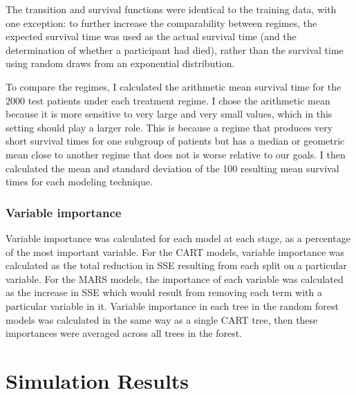 \documentclass[12pt]{article}
\begin{document}
The transition and survival functions were identical to the training data, with one exception: to further increase the comparability between regimes, the expected survival time was used as the actual survival time (and the determination of whether a participant had died), rather than the survival time using random draws from an exponential distribution.

To compare the regimes, I calculated the arithmetic mean survival time for the 2000 test patients under each treatment regime. I chose the arithmetic mean because it is more sensitive to very large and very small values, which in this setting should play a larger role. This is because a regime that produces very short survival times for one subgroup of patients but has a median or geometric mean close to another regime that does not is worse relative to our goals. I then calculated the mean and standard deviation of the 100 resulting mean survival times for each modeling technique.

\subsubsection{Variable importance} %
\label{ssub:variable_importance}

Variable importance was calculated for each model at each stage, as a percentage of the most important variable. For the CART models, variable importance was calculated as the total reduction in SSE resulting from each split on a particular variable. For the MARS models, the importance of each variable was calculated as the increase in SSE which would result from removing each term with a particular variable in it. Variable importance in each tree in the random forest models was calculated in the same way as a single CART tree, then these importances were averaged across all trees in the forest.




\section{Simulation Results} %
\label{sec:simulation_results}
\end{document}
